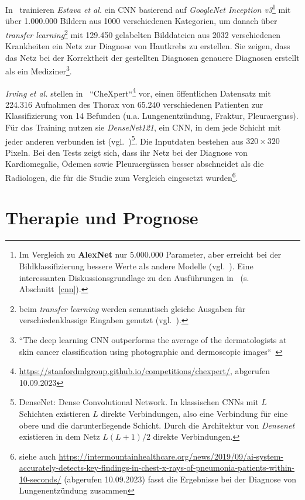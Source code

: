 In~\cite{EKN+17} trainieren \textit{Estava et al.} ein CNN basierend auf \textit{GoogleNet Inception v3}\footnote{
    Im Vergleich zu \textbf{AlexNet} nur 5.000.000 Parameter, aber erreicht bei der Bildklassifizierung bessere Werte als andere Modelle (vgl.~\cite{SVI+15}). Eine interessanten Diskussionsgrundlage zu den Ausführungen in~\cite{Cun89} (s. Abschnitt~\ref{cnn}).
} mit über 1.000.000 Bildern aus 1000 verschiedenen Kategorien, um danach über \textit{transfer learning}\footnote{
    beim \textit{transfer learning} werden semantisch gleiche Ausgaben für verschiedenklassige Eingaben genutzt (vgl.~\cite[602 f.]{GBC18}).
} mit 129.450 gelabelten Bilddateien aus 2032 verschiedenen Krankheiten ein Netz zur Diagnose von Hautkrebs zu erstellen. Sie zeigen, dass das Netz bei der Korrektheit der gestellten Diagnosen genauere Diagnosen erstellt als ein Mediziner\footnote{
    ``The deep learning CNN outperforms the average of the dermatologists at skin cancer classification using photographic and dermoscopic images``~\cite[3, Figure 2]{EKN+17}
}.

\textit{Irving et al.} stellen in~\cite{IRK+19} ``CheXpert``\footnote{
    \url{https://stanfordmlgroup.github.io/competitions/chexpert/}, abgerufen 10.09.2023
} vor, einen öffentlichen Datensatz mit 224.316 Aufnahmen des Thorax von 65.240 verschiedenen Patienten zur Klassifizierung von 14 Befunden (u.a. Lungenentzündung, Fraktur, Pleuraerguss). Für das Training nutzen sie \textit{DenseNet121}, ein CNN, in dem jede Schicht mit jeder anderen verbunden ist (vgl.~\cite{HLW16})\footnote{
    DenseNet: Dense Convolutional Network. In klassischen CNNs mit $L$ Schichten existieren $L$ direkte Verbindungen, also eine Verbindung für eine obere und die darunterliegende Schicht. Durch die Architektur von \textit{Densenet} existieren in dem Netz $L(L +1)/2$ direkte Verbindungen.
}. Die Inputdaten bestehen aus $320 \times 320$ Pixeln. Bei den Tests zeigt sich, dass ihr Netz bei der Diagnose von Kardiomegalie, Ödemen sowie Pleuraergüssen besser abschneidet als die Radiologen, die für die Studie zum Vergleich eingesetzt wurden\footnote{
    siehe auch \url{https://intermountainhealthcare.org/news/2019/09/ai-system-accurately-detects-key-findings-in-chest-x-rays-of-pneumonia-patients-within-10-seconds/} (abgerufen 10.09.2023) fasst die Ergebnisse bei der Diagnose von Lungenentzündung zusammen
}.

\section{Therapie und Prognose}\label{sec:therapieprognose}

